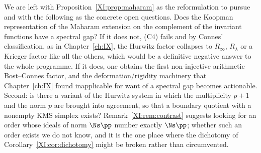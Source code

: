 We are left with Proposition~\ref{XI:prop:maharam} as the reformulation to pursue and with the
following as the concrete open questions. Does the Koopman representation of the Maharam
extension on the complement of the invariant functions have a spectral gap? If it does not,
(C4) fails and by Connes' classification, as in Chapter~\ref{ch:IX}, the Hurwitz factor collapses to
$R_\infty$, $R_\lambda$ or a Krieger factor like all the others, which would be a definitive
negative answer to the whole programme. If it does, one obtains the first non-injective
arithmetic Bost--Connes factor, and the deformation/rigidity machinery that Chapter~\ref{ch:IX} found
inapplicable for want of a spectral gap becomes actionable. Second: is there a variant of the Hurwitz
system in which the multiplicity $p+1$ and the norm $p$ are brought into agreement, so that a
boundary quotient with a nonempty KMS simplex exists? Remark~\ref{XI:rem:contrast} suggests
looking for an order whose ideals of norm $\Ns\pp$ number exactly $\Ns\pp$; whether such an
order exists we do not know, and it is the one place where the dichotomy of
Corollary~\ref{XI:cor:dichotomy} might be broken rather than circumvented.

